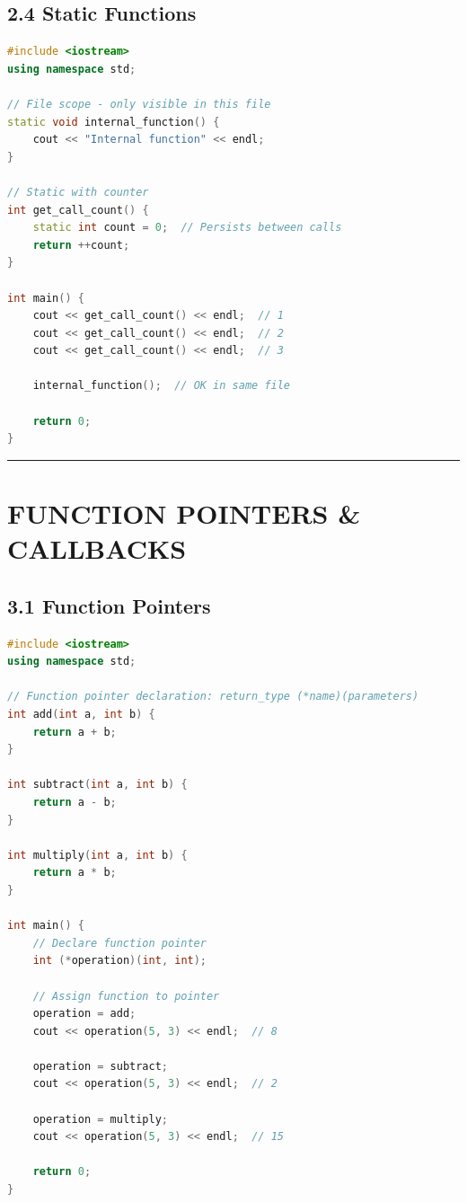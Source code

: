 \hypertarget{static-functions}{%
\section{2.4 Static Functions}\label{static-functions}}

\begin{lstlisting}[language={C++}]
#include <iostream>
using namespace std;

// File scope - only visible in this file
static void internal_function() {
    cout << "Internal function" << endl;
}

// Static with counter
int get_call_count() {
    static int count = 0;  // Persists between calls
    return ++count;
}

int main() {
    cout << get_call_count() << endl;  // 1
    cout << get_call_count() << endl;  // 2
    cout << get_call_count() << endl;  // 3
    
    internal_function();  // OK in same file
    
    return 0;
}
\end{lstlisting}

\begin{center}\rule{0.5\linewidth}{0.5pt}\end{center}

\hypertarget{function-pointers-callbacks}{%
\chapter{FUNCTION POINTERS \&
CALLBACKS}\label{function-pointers-callbacks}}

\hypertarget{function-pointers}{%
\section{3.1 Function Pointers}\label{function-pointers}}

\begin{lstlisting}[language={C++}]
#include <iostream>
using namespace std;

// Function pointer declaration: return_type (*name)(parameters)
int add(int a, int b) {
    return a + b;
}

int subtract(int a, int b) {
    return a - b;
}

int multiply(int a, int b) {
    return a * b;
}

int main() {
    // Declare function pointer
    int (*operation)(int, int);
    
    // Assign function to pointer
    operation = add;
    cout << operation(5, 3) << endl;  // 8
    
    operation = subtract;
    cout << operation(5, 3) << endl;  // 2
    
    operation = multiply;
    cout << operation(5, 3) << endl;  // 15
    
    return 0;
}
\end{lstlisting}

